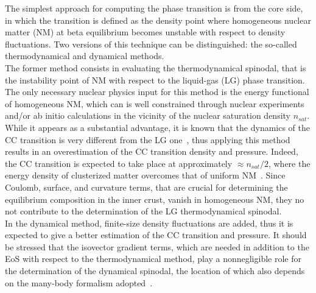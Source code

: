 The simplest approach for computing the phase transition is from the core side, 
in which the transition is defined as the density point where homogeneous 
nuclear matter (NM) at beta equilibrium becomes unstable with respect to 
density fluctuations. Two versions of this technique can be distinguished: the 
so-called thermodynamical \cite{Gonzalez2017} and 
dynamical \cite{Pethick1995cc,Antic2019} methods.\\
The former method consists in evaluating the thermodynamical spinodal, that is 
the instability point of NM with respect to the liquid-gas (LG) phase 
transition. The only necessary nuclear physics input for this method is the 
energy functional of homogeneous NM, which can is well constrained through
nuclear experiments and/or ab initio calculations in the vicinity of the
nuclear saturation density $n_{sat}$. While it appears as a substantial 
advantage, it is known that the dynamics of the CC transition is very different 
from the LG one~\cite{Ducoin2007a,Ducoin2007b,Ducoin2008}, thus applying this 
method results in an overestimation of the 
CC transition density and pressure. Indeed, the CC transition is expected 
to take place at approximately $\approx n_{sat}/2$, where the energy density of 
clusterized matter overcomes that of uniform NM~\cite{BBP}. Since Coulomb, surface,
and curvature terms, that are crucial for determining the equilibrium
composition in the inner crust, vanish in homogeneous NM, they no not 
contribute to the determination of the LG thermodynamical spinodal.\\
In the dynamical method, finite-size density fluctuations are added, thus 
it is expected to give a better estimation of the CC transition and pressure. 
It should be stressed that the isovector gradient terms, which are needed in
addition to the EoS with respect to the thermodynamical method, play a 
nonnegligible role for the determination of the dynamical spinodal, the
location of which also depends on the many-body formalism 
adopted~\cite{Ducoin2008}.

